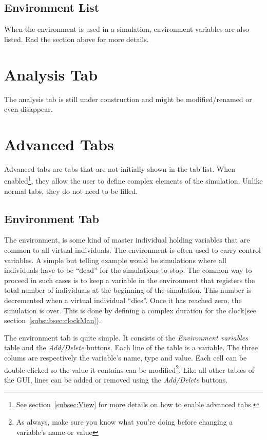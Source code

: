 \documentclass[a4paper,11pt]{report}
\begin{document}
\subsection{Environment List}
When the environment is used in a simulation, environment variables are also listed. Rad the section above for more details.

\section{Analysis Tab}
\label{sec:advTab}
The analysis tab is still under construction and might be modified/renamed or even disappear.

\section{Advanced Tabs}
Advanced tabs are tabs that are not initially shown in the tab list. When enabled\footnote{See section~\ref{subsec:View} for more details on how to enable advanced tabs.}, they allow the user to define complex elements of the simulation. Unlike normal tabs, they do not need to be filled.

\subsection{Environment Tab}
\label{sec:envTab}
The environment, is some kind of master individual holding variables that are common to all virtual individuals. The environment is often used to carry control variables. A simple but telling example would be simulations where all individuals have to be ``dead'' for the simulations to stop. The common way to proceed in such cases is to keep a variable in the environment that registers the total number of individuals at the beginning of the simulation. This number is decremented when a virtual individual ``dies''. Once it has reached zero, the simulation is over. This is done by defining a complex duration for the clock(see section~\ref{subsubsec:clockMan}).

The environment tab is quite simple. It consists of the \emph{Environment variables} table and the \emph{Add/Delete} buttons. Each line of the table is a variable. The three colums are respectively the variable's name, type and value. Each cell can be double-clicked so the value it contains can be modified\footnote{As always, make sure you know what you're doing before changing a variable's name or value}. Like all other tables of the GUI, lines can be added or removed using the \emph{Add/Delete} buttons.
\end{document}
